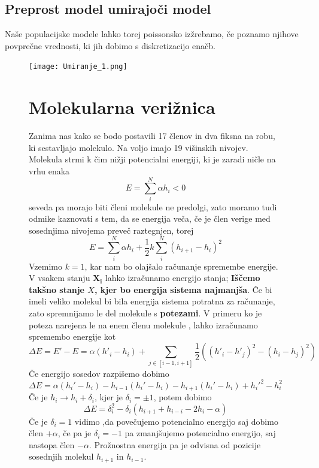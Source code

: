 \documentclass[11pt, a4paper]{article}
\renewcommand{\vec}[1]{\mathbf{#1}}
\begin{document}
\subsection{Preprost model umirajoči model}
Naše populacijske modele lahko torej poissonsko izžrebamo, če poznamo njihove povprečne vrednosti, ki jih dobimo s diskretizacijo enačb.
\begin{figure}[H]
\centering

  \texttt{[image: Umiranje\_1.png]}
 
\iffalse
\section{Molekularna verižnica}
Zanima nas kako se bodo postavili 17 členov in dva fiksna na robu, ki sestavljajo molekulo. Na voljo imajo 19 višinskih nivojev. Molekula strmi k čim nižji potencialni energiji, ki je zaradi ničle na vrhu enaka
\begin{equation}
E = \sum_i^N \alpha h_i < 0 
\end{equation}
seveda pa morajo biti členi molekule ne predolgi, zato moramo tudi odmike kaznovati s tem, da se energija veča, če je člen verige med sosednjima nivojema preveč raztegnjen, torej
\begin{equation}
E = \sum_i^N \alpha h_i  + \frac{1}{2} k \sum_i^N (h_{i+1} - h_i)^2
\end{equation}
Vzemimo  $k = 1$, kar nam bo olajšalo računanje spremembe energije.
V vsakem stanju $\vec{X_i}$ lahko izračunamo energijo stanja; \newline\textbf{Iščemo takšno stanje $X$, kjer bo energija sistema najmanjša}. \newline\newline
Če bi imeli veliko molekul bi bila energija sistema potratna za računanje, zato spremnijamo le del molekule s \textbf{potezami}. V primeru ko je poteza narejena le na enem členu molekule , lahko izračunamo spremembo energije kot
\begin{equation} 
\Delta E = E' - E = \alpha (h'_{i} - h_{i}) + \sum_{j \in [ i -1 , i +1]} \frac{1}{2} ((h'_i - h'_j)^2 - (h_i - h_j)^2)
\end{equation}
Če energijo sosedov razpišemo dobimo
\begin{equation}
\Delta E  = \alpha(h_i' -h_i) - h_{i-1} (h_i' - h_i) - h_{i+1} (h_i' - h_i) + h_i'^2 -h_i^2
\end{equation}
Če je $h_i \rightarrow h_i + \delta_i$, kjer je $\delta_i = \pm 1$, potem dobimo
\begin{equation}
\Delta E = \delta_i^2 - \delta_i ( h_{i+1} + h_{i-i} -2 h_i - \alpha)
\end{equation}
Če je $\delta_i = 1 $ vidimo ,da povečujemo potencialno energijo saj dobimo člen $+ \alpha$, če pa je $\delta_i = -1 $ pa zmanjšujemo potencialno energijo, saj nastopa člen $-\alpha$. Prožnostna energija pa je odvisna od pozicije sosednjih molekul $h_{i+1} $ in $ h_{i-1}$.

\end{figure}
\end{document}
